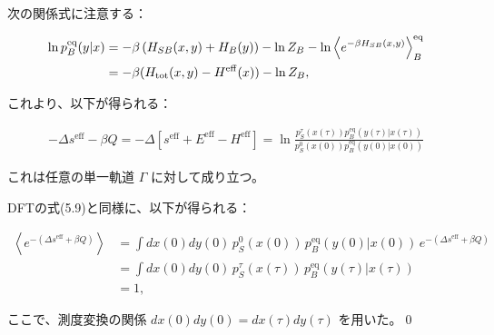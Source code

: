\documentclass[a4paper,11pt]{jsarticle}
\numberwithin{equation}{section}
\begin{document}
次の関係式に注意する：

\begin{align}
\ln p_B^{\mathrm{eq}}(y | x) &= -\beta \left( H_{SB}(x, y) + H_B(y) \right) - \ln Z_B 
- \ln \left\langle e^{-\beta H_{SB}(x, y)} \right\rangle^{\mathrm{eq}}_B \notag \\
&= -\beta (H_{\mathrm{tot}}(x, y) - H^{\mathrm{eff}}(x)) - \ln Z_B,
\end{align}

これより、以下が得られる：

\begin{align}
-\Delta s^{\mathrm{eff}} - \beta Q 
= - \Delta \left[ s^{\mathrm{eff}} + E^{\mathrm{eff}} - H^{\mathrm{eff}} \right]
= \ln \frac{ p_S^{\tau}(x(\tau)) p_B^{\mathrm{eq}}(y(\tau) | x(\tau)) }{ p_S^0(x(0)) p_B^{\mathrm{eq}}(y(0) | x(0)) }
\end{align}

これは任意の単一軌道 $\Gamma$ に対して成り立つ。

DFTの式(5.9)と同様に、以下が得られる：

\begin{align}
\left\langle e^{- ( \Delta s^{\mathrm{eff}} + \beta Q )} \right\rangle 
&= \int dx(0) dy(0)\, p_S^0(x(0))\, p_B^{\mathrm{eq}}(y(0) | x(0))\, e^{ - ( \Delta s^{\mathrm{eff}} + \beta Q ) } \\
&= \int dx(0) dy(0)\, p_S^\tau(x(\tau))\, p_B^{\mathrm{eq}}(y(\tau) | x(\tau)) \\
&= 1,
\end{align}

ここで、測度変換の関係 $dx(0) dy(0) = dx(\tau) dy(\tau)$ を用いた。\qed\\
\end{document}
